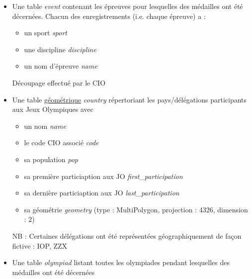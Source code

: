 \documentclass{article}
\begin{document}
\begin{itemize}

\item
Une table \textit{event} contenant les épreuves pour lesquelles des médailles ont été décernées. Chacun des enregistrements (i.e. chaque épreuve) a :

\begin{itemize}

\item un sport \textit{sport}

\item une discipline \textit{discipline}

\item un nom d'épreuve \textit{name}

\end{itemize}

{\footnotesize Découpage effectué par le CIO}

\item
Une table \underline{géométrique} \textit{country} répertoriant les pays/délégations participants aux Jeux Olympiques avec

\begin{itemize}

\item un nom \textit{name}

\item le code CIO associé \textit{code}

\item sa population \textit{pop}

\item sa première particiaption aux JO \textit{first\_participation}

\item sa dernière particiaption aux JO \textit{last\_participation}

\item sa géométrie \textit{geometry} {\footnotesize (type : MultiPolygon, projection : 4326, dimension : 2) }

\end{itemize}

{\footnotesize NB : Certaines délégations ont été représentées géographiquement de façon fictive : IOP, ZZX}

\item
Une table \textit{olympiad} listant toutes les olympiades pendant lesquelles des médailles ont été décernées

\begin{itemize}


\end{itemize}
\end{itemize}
\end{document}
